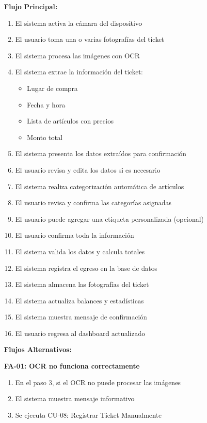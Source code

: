\noindent\textbf{Flujo Principal:}
\begin{enumerate}
    \item El sistema activa la cámara del dispositivo
    \item El usuario toma una o varias fotografías del ticket
    \item El sistema procesa las imágenes con OCR
    \item El sistema extrae la información del ticket:
    \begin{itemize}
        \item Lugar de compra
        \item Fecha y hora
        \item Lista de artículos con precios
        \item Monto total
    \end{itemize}
    \item El sistema presenta los datos extraídos para confirmación
    \item El usuario revisa y edita los datos si es necesario
    \item El sistema realiza categorización automática de artículos
    \item El usuario revisa y confirma las categorías asignadas
    \item El usuario puede agregar una etiqueta personalizada (opcional)
    \item El usuario confirma toda la información
    \item El sistema valida los datos y calcula totales
    \item El sistema registra el egreso en la base de datos
    \item El sistema almacena las fotografías del ticket
    \item El sistema actualiza balances y estadísticas
    \item El sistema muestra mensaje de confirmación
    \item El usuario regresa al dashboard actualizado
\end{enumerate}

\noindent\textbf{Flujos Alternativos:}

\textbf{FA-01: OCR no funciona correctamente}
\begin{enumerate}
    \item En el paso 3, si el OCR no puede procesar las imágenes
    \item El sistema muestra mensaje informativo
    \item Se ejecuta CU-08: Registrar Ticket Manualmente
\end{enumerate}

